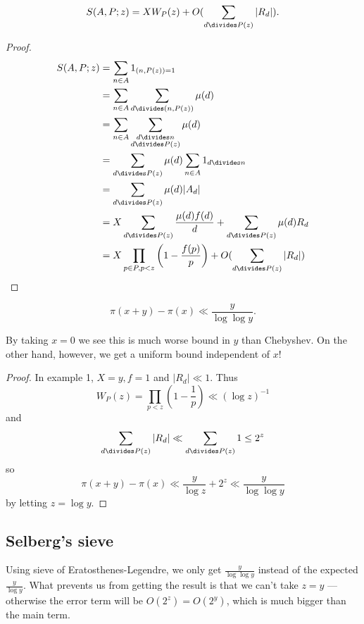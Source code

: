 \documentclass[a4paper]{article}
\theoremstyle{definition}
\begin{document}
\begin{theorem}
  \[
    S(A, P; z) = XW_P(z) + O(\sum_{d \divides P(z)} |R_d|).
  \]
\end{theorem}

\begin{proof}
  \begin{align*}
    S(A, P; z)
    &= \sum_{n \in A} 1_{(n, P(z)) = 1} \\
    &= \sum_{n \in A} \sum_{d \divides (n, P(z))} \mu(d) \\
    &= \sum_{n \in A} \sum_{\substack{d \divides n \\ d \divides P(z)}} \mu(d) \\
    &= \sum_{d \divides P(z)} \mu(d) \sum_{n \in A} 1_{d \divides n} \\
    &= \sum_{d \divides P(z)} \mu(d) |A_d| \\
    &= X \sum_{d \divides P(z)} \frac{\mu(d) f(d)}{d} + \sum_{d \divides P(z)} \mu(d) R_d \\
    &= X \prod_{p \in P, p < z} \left(1 - \frac{f(p)}{p} \right) + O(\sum_{d \divides P(z)} |R_d|)
  \end{align*}
\end{proof}

\begin{corollary}
  \[
    \pi(x + y) - \pi(x) \ll \frac{y}{\log \log y}.
  \]
\end{corollary}
By taking \(x = 0\) we see this is much worse bound in \(y\) than Chebyshev. On the other hand, however, we get a uniform bound independent of \(x\)!

\begin{proof}
  In example 1, \(X = y, f = 1\) and \(|R_d| \ll 1\). Thus
  \[
    W_P(z)
    = \prod_{p < z} \left( 1 - \frac{1}{p} \right)
    \ll (\log z)^{-1}
  \]
  and
  \[
    \sum_{d \divides P(z)} |R_d| \ll \sum_{d \divides P(z)} 1 \leq 2^z
  \]
  so
  \[
    \pi(x + y) - \pi(x) \ll \frac{y}{\log z} + 2^z \ll \frac{y}{\log \log y}
  \]
  by letting \(z = \log y\).
\end{proof}

\subsection{Selberg's sieve}

Using sieve of Eratosthenes-Legendre, we only get \(\frac{y}{\log\log y}\) instead of the expected \(\frac{y}{\log y}\). What prevents us from getting the result is that we can't take \(z = y\) --- otherwise the error term will be \(O(2^z) = O(2^y)\), which is much bigger than the main term.
\end{document}
